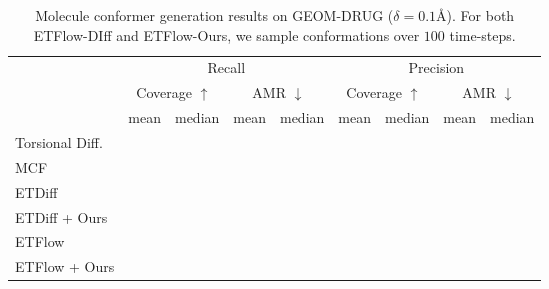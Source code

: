 \begin{table*}[ht!]
    \caption{Molecule conformer generation results on GEOM-DRUG ($\delta = 0.1\text{\AA}$). For both ETFlow-DIff and ETFlow-Ours, we sample conformations over $100$ time-steps.}
    \label{tab:qm9}
    \centering
    \renewcommand{\arraystretch}{1.1} %
    \begin{tabular}{lcccccccc}
    \toprule
     & \multicolumn{4}{c}{Recall} & \multicolumn{4}{c}{Precision} \\
     & \multicolumn{2}{c}{Coverage $\uparrow$} & \multicolumn{2}{c}{AMR $\downarrow$} & \multicolumn{2}{c}{Coverage $\uparrow$} & \multicolumn{2}{c}{AMR $\downarrow$} \\
        \hline
        & mean & median & mean & median & mean & median & mean & median\\
        \hline
        Torsional Diff. &  &  &  &  &  &  &  &  \\
        MCF             &  &  &  &  &  &  &  &  \\
        \hline
        ETDiff          &  &  &  &  &  &  &  &  \\
        ETDiff + Ours   &  &  & 
        &  &  &  &  &  \\
        \hline
        ETFlow          &  &  &  &  &  &  &  &  \\
        ETFlow + Ours   &  &  &  &  &  &  &  &  \\
        \bottomrule
    \end{tabular}
\end{table*}